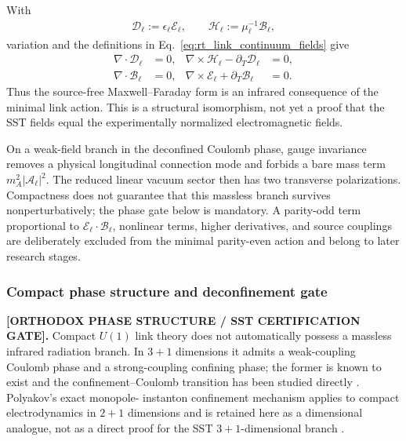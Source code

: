 With
\begin{align}
    \boldsymbol{\mathcal D}_\ell
    :=\epsilon_\ell\boldsymbol{\mathcal E}_\ell,
    \qquad
    \boldsymbol{\mathcal H}_\ell
    :=\mu_\ell^{-1}\boldsymbol{\mathcal B}_\ell,
\end{align}
variation and the definitions in Eq.~\eqref{eq:rt_link_continuum_fields} give
\begin{align}
    \nabla\cdot\boldsymbol{\mathcal D}_\ell&=0,
    &
    \nabla\times\boldsymbol{\mathcal H}_\ell
    -\partial_T\boldsymbol{\mathcal D}_\ell&=0,
    \\
    \nabla\cdot\boldsymbol{\mathcal B}_\ell&=0,
    &
    \nabla\times\boldsymbol{\mathcal E}_\ell
    +\partial_T\boldsymbol{\mathcal B}_\ell&=0.
    \label{eq:rt_link_source_free_maxwell_structure}
\end{align}
Thus the source-free Maxwell--Faraday form is an infrared consequence of the
minimal link action.  This is a structural isomorphism, not yet a proof that the
SST fields equal the experimentally normalized electromagnetic fields.

On a weak-field branch in the deconfined Coulomb phase, gauge invariance removes
a physical longitudinal connection mode and forbids a bare mass term
$m_A^2|\boldsymbol{\mathcal A}_\ell|^2$.  The reduced linear vacuum sector then
has two transverse polarizations.  Compactness does not guarantee that this
massless branch survives nonperturbatively; the phase gate below is mandatory.
A parity-odd term proportional
to $\boldsymbol{\mathcal E}_\ell\cdot\boldsymbol{\mathcal B}_\ell$, nonlinear
terms, higher derivatives, and source couplings are deliberately excluded from
the minimal parity-even action and belong to later research stages.

\subsubsection{Compact phase structure and deconfinement gate}
\label{subsubsec:rt_compact_u1_deconfinement_gate}

\textbf{[ORTHODOX PHASE STRUCTURE / SST CERTIFICATION GATE].}
Compact \(U(1)\) link theory does not automatically possess a massless infrared
radiation branch.  In \(3{+}1\) dimensions it admits a weak-coupling Coulomb
phase and a strong-coupling confining phase; the former is known to exist and
the confinement--Coulomb transition has been studied directly
\cite{Guth1980,JersakLangNeuhaus1996,Kogut1979}.  Polyakov's exact monopole-
instanton confinement mechanism applies to compact electrodynamics in
\(2{+}1\) dimensions and is retained here as a dimensional analogue, not as a
direct proof for the SST \(3{+}1\)-dimensional branch \cite{Polyakov1977}.

